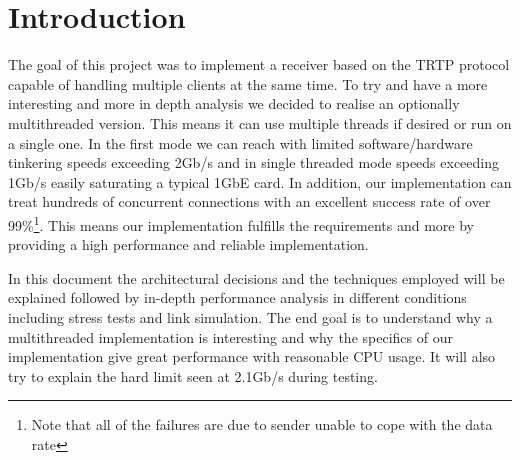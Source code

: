 \documentclass[../main.tex]{subfiles}
\begin{document}
\section{Introduction}

The goal of this project was to implement a receiver based on the TRTP protocol capable of handling multiple clients at the same time. To try and have a more interesting and more in depth analysis we decided to realise an optionally multithreaded version. This means it can use multiple threads if desired or run on a single one. In the first mode we can reach with limited software/hardware tinkering speeds exceeding 2Gb/s and in single threaded mode speeds exceeding 1Gb/s easily saturating a typical 1GbE card. In addition, our implementation can treat hundreds of concurrent connections with an excellent success rate of over 99\%\footnote{Note that all of the failures are due to sender unable to cope with the data rate}. This means our implementation fulfills the requirements and more by providing a high performance and reliable implementation.

In this document the architectural decisions and the techniques employed will be explained followed by in-depth performance analysis in different conditions including stress tests and link simulation. The end goal is to understand why a multithreaded implementation is interesting and why the specifics of our implementation give great performance with reasonable CPU usage. It will also try to explain the hard limit seen at 2.1Gb/s during testing.
\end{document}
